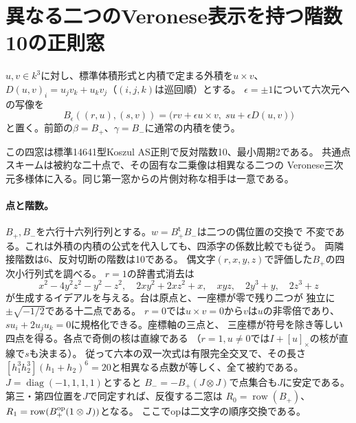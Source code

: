 \section{異なる二つのVeronese表示を持つ階数10の正則窓}
\label{sec:twenty-point-companion}
$u,v\in k^3$に対し、標準体積形式と内積で定まる外積を$u\times v$、
$D(u,v)_i=u_jv_k+u_kv_j$（$(i,j,k)$は巡回順）とする。
$\epsilon=\pm1$について六次元への写像を
\[
 B_\epsilon((r,u),(s,v))
 =\big(rv+\epsilon u\times v,\;su+\epsilon D(u,v)\big)
\]
と置く。前節の$\beta=B_+$、$\gamma=B_-$に通常の内積を使う。

\begin{theorem}\label{thm:twenty-point-distinct-companion}
この四窓は標準14641型Koszul AS正則で反対階数10、最小周期2である。
共通点スキームは被約な二十点で、その固有な二乗像は相異なる二つの
Veronese三次元多様体に入る。同じ第一窓からの片側対称な相手は一意である。
\end{theorem}

\paragraph{点と階数。}
$B_+,B_-$を六行十六列行列とする。$w=B_+^{\mathsf t}B_-$は二つの偶位置の交換で
不変である。これは外積の内積の公式を代入しても、四添字の係数比較でも従う。
両隣接階数は6、反対切断の階数は10である。
偶文字$(r,x,y,z)$で評価した$B_+$の四次小行列式を調べる。
$r=1$の辞書式消去は
\[
 x^2-4y^2z^2-y^2-z^2,\quad 2xy^2+2xz^2+x,\quad xyz,\quad
 2y^3+y,\quad 2z^3+z
\]
が生成するイデアルを与える。台は原点と、一座標が零で残り二つが
独立に$\pm\sqrt{-1/2}$である十二点である。
$r=0$では$u\times v=0$から$v$は$u$の非零倍であり、
$s u_i+2u_ju_k=0$に規格化できる。座標軸の三点と、
三座標が符号を除き等しい四点を得る。各点で奇側の核は直線である
（$r=1,u\ne0$では$I+[u]_\times$の核が直線で$s$も決まる）。
従って六本の双一次式は有限完全交叉で、その長さ
$[h_1^3h_2^3](h_1+h_2)^6=20$と相異なる点数が等しく、全て被約である。
$J=\operatorname{diag}(-1,1,1,1)$とすると
$B_-=-B_+(J\otimes J)$で点集合も$J$に安定である。
第三・第四位置を$J$で同定すれば、反復する二窓は
$R_0=\operatorname{row}(B_+)$、$R_1=\operatorname{row}(B_+^{\rm op}(1\otimes J))$となる。
ここで$\mathrm{op}$は二文字の順序交換である。

